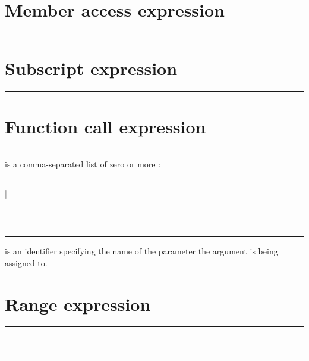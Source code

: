 \section{Member access expression}

\begin{grammar}
\rule{member-access-expression}   
\end{grammar}

\section{Subscript expression}

\begin{grammar}
\rule{subscript-expression}  \code{[}  \code{]}
\end{grammar}

\section{Function call expression}

\begin{grammar}
\rule{call-expression}  \code{(}  \code{)}
\end{grammar}

 is a comma-separated list of zero or more
:

\begin{grammar}
\rule{argument-specifier}  | \\
\rule{unnamed-argument} \\
\rule{named-argument}  \code{:} 
\end{grammar}

 is an identifier specifying the name of the
parameter the argument  is being assigned to.

\section{Range expression}

\begin{grammar}
\rule{exclusive-range-expression}   \\
\rule{inclusive-range-expression}   
\end{grammar}

